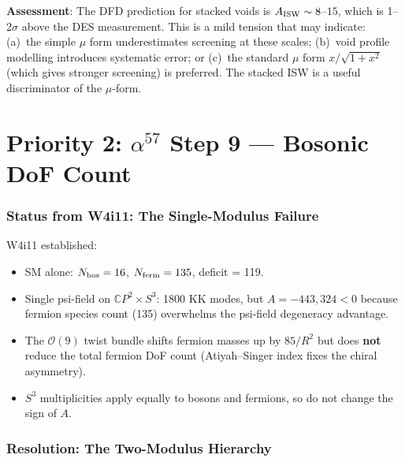 \documentclass[11pt,a4paper]{article}
\newcommand{\mufd}{\mu}
\newcommand{\CP}{\mathbb{C}P}
\newcommand{\Nbos}{N_{\rm bos}}
\newcommand{\Nferm}{N_{\rm ferm}}
\begin{document}
\textbf{Assessment}: The DFD prediction for stacked voids is
$A_{\rm ISW} \sim 8$--$15$, which is 1--2$\sigma$ above the DES
measurement.  This is a mild tension that may indicate:
(a)~the simple $\mufd$ form underestimates screening at these scales;
(b)~void profile modelling introduces systematic error; or
(c)~the standard $\mufd$ form $x/\sqrt{1+x^2}$ (which gives
stronger screening) is preferred.  The stacked ISW is a useful
discriminator of the $\mufd$-form.


\part{Priority 2: $\alpha^{57}$ Step 9 --- Bosonic DoF Count}
\label{part:alpha57}


\section{Status from W4i11: The Single-Modulus Failure}
\label{sec:alpha57-status}

W4i11 established:
\begin{itemize}[nosep]
\item SM alone: $\Nbos = 16$, $\Nferm = 135$, deficit = 119.
\item Single psi-field on $\CP^2 \times S^3$: 1800 KK modes, but
  $A = -443{,}324 < 0$ because fermion species count (135) overwhelms
  the psi-field degeneracy advantage.
\item The $\mathcal{O}(9)$ twist bundle shifts fermion masses up by
  $85/R^2$ but does \textbf{not} reduce the total fermion DoF count
  (Atiyah--Singer index fixes the chiral asymmetry).
\item $S^3$ multiplicities apply equally to bosons and fermions,
  so do not change the sign of $A$.
\end{itemize}


\section{Resolution: The Two-Modulus Hierarchy}
\label{sec:alpha57}
\end{document}

